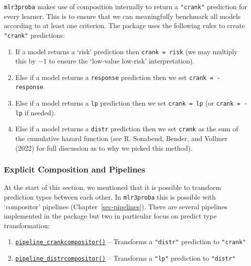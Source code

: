 \texttt{mlr3proba} makes use of composition internally to return a
\texttt{"crank"} prediction for every learner. This is to ensure that we
can meaningfully benchmark all models according to at least one
criterion. The package uses the following rules to create
\texttt{"crank"} predictions:

\begin{enumerate}
\def\labelenumi{\arabic{enumi}.}
\tightlist
\item
  If a model returns a `risk' prediction then \texttt{crank\ =\ risk}
  (we may multiply this by \(-1\) to ensure the `low-value low-risk'
  interpretation).
\item
  Else if a model returns a \texttt{response} prediction then we set
  \texttt{crank\ =\ -response}.
\item
  Else if a model returns a \texttt{lp} prediction then we set
  \texttt{crank\ =\ lp} (or \texttt{crank\ =\ -lp} if needed).
\item
  Else if a model returns a \texttt{distr} prediction then we set
  \texttt{crank} as the sum of the cumulative hazard function (see R.
  Sonabend, Bender, and Vollmer (2022) for full discussion as to why we
  picked this method).
\end{enumerate}

\hypertarget{explicit-composition-and-pipelines}{%
\subsubsection{Explicit Composition and
Pipelines}\label{explicit-composition-and-pipelines}}

At the start of this section, we mentioned that it is possible to
transform prediction types between each other. In \texttt{mlr3proba}
this is possible with `compositor' pipelines
(Chapter~\ref{sec-pipelines}). There are several pipelines implemented
in the package but two in particular focus on predict type
transformation:

\begin{enumerate}
\def\labelenumi{\arabic{enumi}.}
\tightlist
\item
  \href{https://mlr3proba.mlr-org.com/reference/mlr_graphs_crankcompositor.html}{\texttt{pipeline\_crankcompositor()}}
  -- Transforms a \texttt{"distr"} prediction to \texttt{"crank"}
\item
  \href{https://mlr3proba.mlr-org.com/reference/mlr_graphs_distrcompositor.html}{\texttt{pipeline\_distrcompositor()}}
  -- Transforms a \texttt{"lp"} prediction to \texttt{"distr"}
\end{enumerate}

